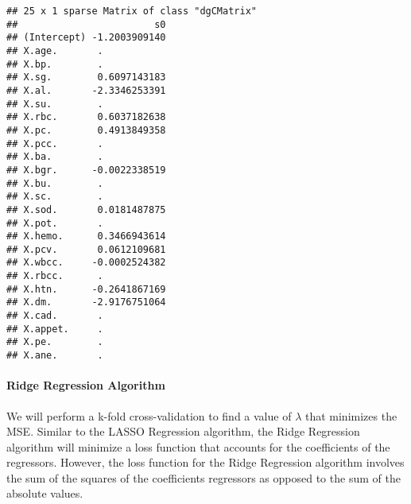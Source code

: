\documentclass[
]{article}
\newenvironment{Shaded}{\begin{snugshade}}{\end{snugshade}}
\newcommand{\AttributeTok}[1]{\textcolor[rgb]{0.77,0.63,0.00}{#1}}
\newcommand{\CommentTok}[1]{\textcolor[rgb]{0.56,0.35,0.01}{\textit{#1}}}
\newcommand{\DecValTok}[1]{\textcolor[rgb]{0.00,0.00,0.81}{#1}}
\newcommand{\FunctionTok}[1]{\textcolor[rgb]{0.00,0.00,0.00}{#1}}
\newcommand{\NormalTok}[1]{#1}
\newcommand{\OtherTok}[1]{\textcolor[rgb]{0.56,0.35,0.01}{#1}}
\newcommand{\SpecialCharTok}[1]{\textcolor[rgb]{0.00,0.00,0.00}{#1}}
\newcommand{\StringTok}[1]{\textcolor[rgb]{0.31,0.60,0.02}{#1}}
\begin{document}
\begin{verbatim}
## 25 x 1 sparse Matrix of class "dgCMatrix"
##                        s0
## (Intercept) -1.2003909140
## X.age.       .           
## X.bp.        .           
## X.sg.        0.6097143183
## X.al.       -2.3346253391
## X.su.        .           
## X.rbc.       0.6037182638
## X.pc.        0.4913849358
## X.pcc.       .           
## X.ba.        .           
## X.bgr.      -0.0022338519
## X.bu.        .           
## X.sc.        .           
## X.sod.       0.0181487875
## X.pot.       .           
## X.hemo.      0.3466943614
## X.pcv.       0.0612109681
## X.wbcc.     -0.0002524382
## X.rbcc.      .           
## X.htn.      -0.2641867169
## X.dm.       -2.9176751064
## X.cad.       .           
## X.appet.     .           
## X.pe.        .           
## X.ane.       .
\end{verbatim}

\hypertarget{ridge-regression-algorithm}{%
\paragraph{Ridge Regression
Algorithm}\label{ridge-regression-algorithm}}

We will perform a k-fold cross-validation to find a value of \(\lambda\)
that minimizes the MSE. Similar to the LASSO Regression algorithm, the
Ridge Regression algorithm will minimize a loss function that accounts
for the coefficients of the regressors. However, the loss function for
the Ridge Regression algorithm involves the sum of the squares of the
coefficients regressors as opposed to the sum of the absolute values.

\begin{Shaded}
\end{Shaded}
\end{document}
